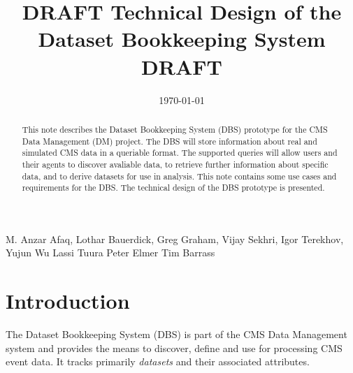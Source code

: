 \documentclass{cmspaper}
\begin{document}

\begin{titlepage}

   \date{\today}

  \title{DRAFT Technical Design of the Dataset Bookkeeping System DRAFT}


  \begin{Authlist}
    M. Anzar Afaq, Lothar Bauerdick, Greg Graham, Vijay Sekhri, Igor Terekhov, 
    Yujun Wu
    Lassi Tuura
    Peter Elmer
    Tim Barrass
  \end{Authlist}


  \begin{abstract}
      This note describes the Dataset Bookkeeping System (DBS) prototype for the 
  CMS Data Management (DM) project.  The DBS will
  store information about real and simulated CMS data in a queriable format. 
  The supported queries will allow users and their agents to discover avaliable 
  data, to retrieve further information about specific data, and to 
  derive datasets for use in analysis. This note contains some use cases 
  and requirements for the DBS.  The technical design of the DBS prototype
  is presented.
    \end{abstract} 

  
\end{titlepage}

\setcounter{page}{2}%

\section{Introduction}
\label{sec:intro}

The Dataset Bookkeeping System (DBS) is part of the CMS Data Management system
and provides the means to discover, define and use for processing CMS event 
data. It tracks primarily {\em datasets} and their associated attributes.
\end{document}
